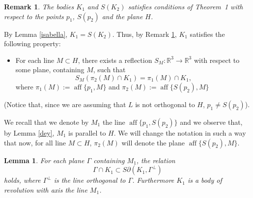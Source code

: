 \documentclass[12pt]{article}
\newcommand{\aff}{\operatorname*{aff}}
\newcommand{\Rt}{\mathbb{R}^3}
\newtheorem{lemma}{Lemma}
\newtheorem{remark}{Remark}
\begin{document}
\begin{remark}\label{vivaldi} 
The bodies $K_1$ and $S(K_2)$ satisfies conditions of Theorem~1 with respect to the points $p_1$, $S(p_2)$ and the plane $H$.
\end{remark}
By Lemma \ref{isabella}, $K_1=S(K_2)$. Thus, by Remark \ref{vivaldi}, $K_1$ satisfies the following property:
\begin{itemize} 
\item[(*)] For each line $M\subset  H$,
there exists a reflection $S_{M}:\Rt \rightarrow \Rt$ with respect to some plane, containing $M$, such that
\[
S_{M}(\pi_{2}(M)\cap  K_1)= \pi_{1}(M)\cap K_{1},
\]
where $\pi_{1}(M):=\aff\{p_1,M\}$ and $\pi_{2}(M):=\aff\{S(p_2),M\}$
\end{itemize}
(Notice that, since we are assuming that $L$ is not orthogonal to $H$, $p_1\not=S(p_2)$).

We recall that we denote by $M_1$ the line $\aff \{p_1,S (p_2)\}$ and we observe that, by Lemma \ref{dey}, $M_1$ is parallel to $H$. We will change the notation in such a way that now, for all line $M\subset H$, $\pi_2(M)$ will denote the plane 
$\aff\{S(p_2),M\}$.

\begin{lemma}\label{margarita}
For each plane $\Gamma$ con\-tai\-ning $ M_1$, the relation
\[
\Gamma \cap K_1 \subset S\partial (K_1,\Gamma^\perp)
\]
holds, where $\Gamma^\perp$ is the line orthogonal to $\Gamma$. Furthermore $K_1$ is a body of revolution with axis the line $M_1$.
\end{lemma}
\end{document}

